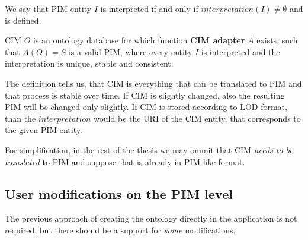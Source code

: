 \begin{definition}[interpretation]
    We say that PIM entity $I$ is interpreted if and only if $interpretation(I) \neq \emptyset$ and is defined.
\end{definition}

\begin{definition}[CIM]
CIM $O$ is an ontology database for which function \textbf{CIM adapter} $A$ exists, such that $A(O) = S$ is a valid PIM, where every entity $I$ is interpreted and the interpretation is unique, stable and consistent.
\end{definition}

The definition tells us, that CIM is everything that can be translated to PIM and that process is stable over time. If CIM is slightly changed, also the resulting PIM will be changed only slightly. If CIM is stored according to LOD format, than the $interpretation$ would be the URI of the CIM entity, that corresponds to the given PIM entity.

For simplification, in the rest of the thesis we may ommit that CIM \textit{needs to be translated} to PIM and suppose that is already in PIM-like format.




\subsection{User modifications on the PIM level}


\begin{requirement}
    \label{requirement:pim-editing}
    The previous approach of creating the ontology directly in the application is not required, but there should be a support for \textit{some} modifications.
\end{requirement}

